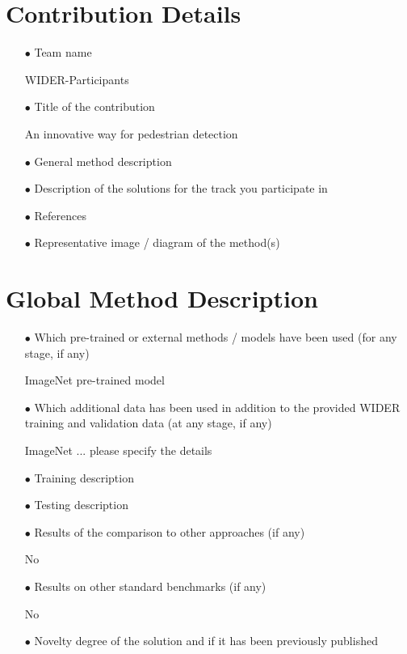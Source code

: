 \documentclass[runningheads]{llncs}
\begin{document}
\section{Contribution Details}
\begin{spacing}{1.5}
\begin{itemize}
\item[$\bullet$] Team name

WIDER-Participants

\item[$\bullet$] Title of the contribution

An innovative way for pedestrian detection

\item[$\bullet$] General method description

\item[$\bullet$] Description of the solutions for the track you participate in

\item[$\bullet$] References

\item[$\bullet$] Representative image / diagram of the method(s)

\end{itemize}
\end{spacing}

\section{Global Method Description}
\begin{spacing}{1.5}
\begin{itemize}

\item[$\bullet$] Which pre-trained or external methods / models have been used (for any stage, if any)

ImageNet pre-trained model

\item[$\bullet$] Which additional data has been used in addition to the provided WIDER training and validation data (at any stage, if any)

ImageNet ... please specify the details

\item[$\bullet$] Training description

\item[$\bullet$] Testing description

\item[$\bullet$] Results of the comparison to other approaches (if any)

No

\item[$\bullet$] Results on other standard benchmarks (if any)

No

\item[$\bullet$] Novelty degree of the solution and if it has been previously published

\end{itemize}
\end{spacing}
\end{document}
